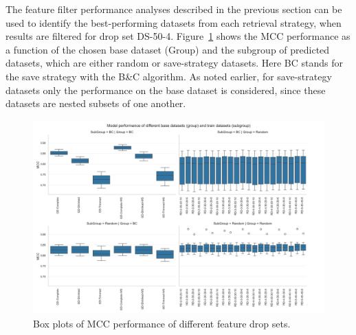 The feature filter performance analyses described in the previous section can be used to identify the best-performing datasets
from each retrieval strategy, when results are filtered for drop set DS-50-4. Figure~\ref{fig:dataset_performance_group_subgroup}
shows the MCC performance as a function of the chosen base dataset (Group) and the subgroup of predicted datasets, which are either
random or save-strategy datasets. Here BC stands for the save strategy with the B\&C algorithm.
As noted earlier, for save-strategy datasets only the performance on the base dataset is considered,
since these datasets are nested subsets of one another.
\begin{figure}[ht]
	\centering
	\includegraphics[width =\textwidth]{pictures/feature_filter/group_subgroup_results.png}
	\caption{Box plots of MCC performance of different feature drop sets.}
	\label{fig:dataset_performance_group_subgroup}
\end{figure}

